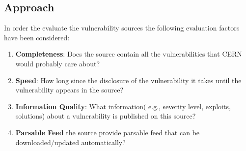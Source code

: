 \subsection{Approach}

In order the evaluate the vulnerability sources the following evaluation factors have been considered:
\begin{enumerate}
\item \textbf{Completeness}: Does the source contain all the vulnerabilities that CERN would probably care about? 
\item \textbf{Speed}: How long since the disclosure of the vulnerability it takes until the vulnerability appears in the source?
\item \textbf{Information Quality}: What information( e.g., severity level, exploits, solutions) about a vulnerability is published on this source?
\item \textbf{Parsable Feed} the source provide parsable feed that can be downloaded/updated automatically?
\end{enumerate} 

